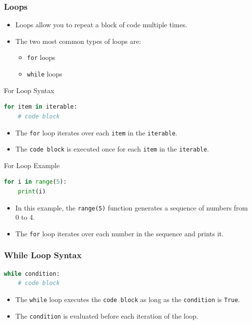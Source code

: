 \documentclass{beamer}
\begin{document}
\begin{frame}
    \frametitle{Loops}
    \begin{itemize}
        \item Loops allow you to repeat a block of code multiple times.
        \item The two most common types of loops are:
        \begin{itemize}
            \item \texttt{for} loops
            \item \texttt{while} loops
        \end{itemize}
    \end{itemize}           
\end{frame}

\begin{frame}[fragile]{For Loop Syntax}
    \begin{lstlisting}[style=colorful, language=Python]
for item in iterable:
    # code block
    \end{lstlisting}
    \begin{itemize}
        \item The \texttt{for} loop iterates over each \texttt{item} in the \texttt{iterable}.
        \item The \texttt{code block} is executed once for each \texttt{item} in the \texttt{iterable}.
    \end{itemize}
\end{frame}

\begin{frame}[fragile]{For Loop Example}
    \begin{lstlisting}[style=colorful, language=Python]
for i in range(5):
    print(i)
    \end{lstlisting}
    \begin{itemize}
        \item In this example, the \texttt{range(5)} function generates a sequence of numbers from 0 to 4.
        \item The \texttt{for} loop iterates over each number in the sequence and prints it.
    \end{itemize}
\end{frame}

\begin{frame}[fragile]
    \frametitle{While Loop Syntax}
    \begin{lstlisting}[style=colorful, language=Python]
while condition:
    # code block
    \end{lstlisting}
    \begin{itemize}
        \item The \texttt{while} loop executes the \texttt{code block} as long as the \texttt{condition} is \texttt{True}.
        \item The \texttt{condition} is evaluated before each iteration of the loop.
    \end{itemize}
\end{frame}
\end{document}
